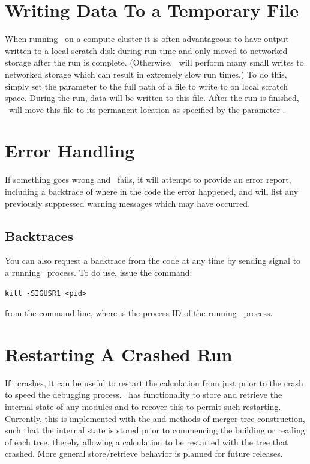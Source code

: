 \section{Writing Data To a Temporary File}

When running \glc\ on a compute cluster it is often advantageous to have output written to a local scratch disk during run time and only moved to networked storage after the run is complete. (Otherwise, \glc\ will perform many small writes to networked storage which can result in extremely slow run times.) To do this, simply set the parameter \mono{[galacticusOutputScratchFileName]} to the full path of a file to write to on local scratch space. During the run, data will be written to this file. After the run is finished, \glc\ will move this file to its permanent location as specified by the parameter \mono{[galacticusOutputFileName]}.

\section{Error Handling}

If something goes wrong and \glc\ fails, it will attempt to provide an error report, including a backtrace of where in the code the error happened, and will list any previously suppressed warning messages which may have occurred.

\subsection{Backtraces}

You can also request a backtrace from the code at any time by sending signal  to a running \glc\ process. To do use, issue the command:
\begin{verbatim}
kill -SIGUSR1 <pid>
\end{verbatim}
from the command line, where  is the process ID of the running \glc\ process.

\section{Restarting A Crashed Run}\label{sec:Restarting}

If \glc\ crashes, it can be useful to restart the calculation from just prior to the crash to speed the debugging process. \glc\ has functionality to store and retrieve the internal state of any modules and to recover this to permit such restarting. Currently, this is implemented with the  and  methods of merger tree construction, such that the internal state is stored prior to commencing the building or reading of each tree, thereby allowing a calculation to be restarted with the tree that crashed. More general store/retrieve behavior is planned for future releases.

